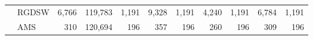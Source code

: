 \begin{table}[H]
\begin{tabular}{llrrrrrrrrr}
\cline{2-11}
\bfseries  & RGDSW & 6,766 & {\cellcolor[HTML]{E2E4FB}} \color[HTML]{000000} 119,783 & 1,191 & {\cellcolor[HTML]{ACB8F4}} \color[HTML]{000000} 9,328 & 1,191 & {\cellcolor[HTML]{768BEC}} \color[HTML]{F1F1F1} 4,240 & 1,191 & {\cellcolor[HTML]{405FE5}} \color[HTML]{F1F1F1} 6,784 & 1,191 \\
\cline{2-11}
\bfseries  & AMS & 310 & {\cellcolor[HTML]{E2E4FB}} \color[HTML]{000000} 120,694 & 196 & {\cellcolor[HTML]{768BEC}} \color[HTML]{F1F1F1} 357 & 196 & {\cellcolor[HTML]{ACB8F4}} \color[HTML]{000000} 260 & 196 & {\cellcolor[HTML]{405FE5}} \color[HTML]{F1F1F1} 309 & 196 \\
\cline{1-11} \cline{2-11}
\bottomrule
\end{tabular}
\end{table}
